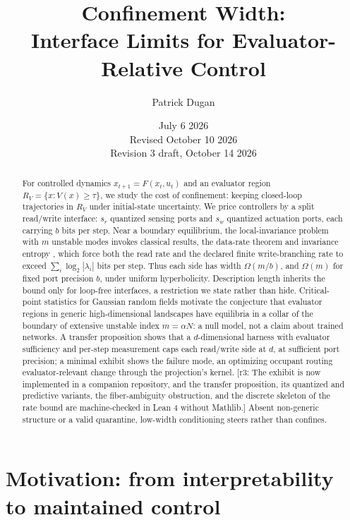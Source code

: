 \documentclass[11pt]{article}
\title{Confinement Width:\\Interface Limits for Evaluator-Relative Control}
\author{Patrick Dugan}
\date{July 6 2026\\Revised October 10 2026\\\textcolor{red!60!black}{Revision 3 draft, October 14 2026}}
\theoremstyle{definition}
\theoremstyle{remark}
\newcommand{\RV}{R_V}
\newcommand{\sr}{s_r}
\newcommand{\sw}{s_w}
\newcommand{\revnote}[1]{\textcolor{red!60!black}{[r3: #1]}}
\begin{document}
\maketitle

\begin{abstract}
For controlled dynamics $x_{t+1}=F(x_t,u_t)$ and an evaluator region $\RV=\{x: V(x)\ge\tau\}$, we study the cost of confinement: keeping closed-loop trajectories in $\RV$ under initial-state uncertainty. We price controllers by a split read/write interface: $\sr$ quantized sensing ports and $\sw$ quantized actuation ports, each carrying $b$ bits per step. Near a boundary equilibrium, the local-invariance problem with $m$ unstable modes invokes classical results, the data-rate theorem and invariance entropy \cite{tatikonda2004,nair2000,colonius2009,kawan2013}, which force both the read rate and the declared finite write-branching rate to exceed $\sum_i\log_2|\lambda_i|$ bits per step. Thus each side has width $\Omega(m/b)$, and $\Omega(m)$ for fixed port precision $b$, under uniform hyperbolicity. Description length inherits the bound only for loop-free interfaces, a restriction we state rather than hide. Critical-point statistics for Gaussian random fields \cite{bray2007,auffinger2013,fyodorov2004} motivate the conjecture that evaluator regions in generic high-dimensional landscapes have equilibria in a collar of the boundary of extensive unstable index $m=\alpha N$: a null model, not a claim about trained networks. A transfer proposition shows that a $d$-dimensional harness with evaluator sufficiency and per-step measurement caps each read/write side at $d$, at sufficient port precision; a minimal exhibit shows the failure mode, an optimizing occupant routing evaluator-relevant change through the projection's kernel. \revnote{The exhibit is now implemented in a companion repository, and the transfer proposition, its quantized and predictive variants, the fiber-ambiguity obstruction, and the discrete skeleton of the rate bound are machine-checked in Lean 4 without Mathlib.} Absent non-generic structure or a valid quarantine, low-width conditioning steers rather than confines.
\end{abstract}

\tableofcontents

\section{Motivation: from interpretability to maintained control}
\end{document}
